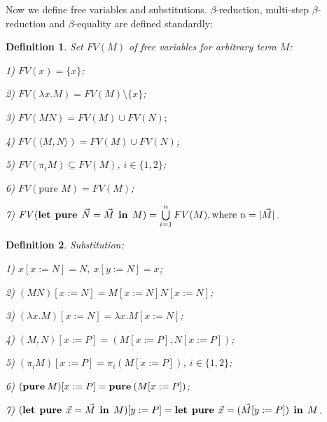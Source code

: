 \documentclass[a4paper]{article}
\newtheorem{defin}{Definition}
\begin{document}
  \vspace{\baselineskip}

  Now we define free variables and substitutions. $\beta$-reduction, multi-step $\beta$-reduction and $\beta$-equality are defined standardly:

  \begin{defin} Set $FV(M)$ of free variables for arbitrary term $M$:

  1) $FV(x) = \{ x \}$;

  2) $FV(\lambda x. M) = FV(M) \setminus \{ x\}$;

  3) $FV(M N) = FV(M) \cup FV(N);$

  4) $FV(\langle M,N \rangle) = FV(M) \cup FV(N)$;

  5) $FV(\pi_i M) \subseteq FV(M)$, $i \in \{ 1, 2\}$;

  6) $FV(\text{pure } M) = FV(M)$;

  7) $FV({\bf let \:\: pure} \:\: \vec{N} = \vec{M} \:\: {\bf in} \:\: M) = \bigcup \limits_{i = 1}^n FV(M), \text{where $n = |\vec{M}|$}$.
  \end{defin}

  \begin{defin} Substitution:

  1) $x [x := N] = N$, $x [y := N] = x$;

  2) $(M N) [x := N] = M[x := N] N [x := N]$;

  3) $(\lambda x. M) [x := N] = \lambda x. M [x := N]$;

  4) $(M, N)[x := P] = (M[x := P], N [x := P])$;

  5) $(\pi_i M) [x := P] = \pi_i (M[x := P])$, $i \in \{ 1, 2\}$;

  6) $({\bf pure \: } M) [x := P] = {\bf pure \: } (M [x := P])$;

  7) $({\bf let \:\: pure} \:\: \vec{x} = \vec{M} \:\: {\bf in} \:\: M) [y := P] = {\bf let \:\: pure} \:\: \vec{x} = (\vec{M} [y := P]) \:\: {\bf in} \:\: M$.
  \end{defin}
\end{document}
